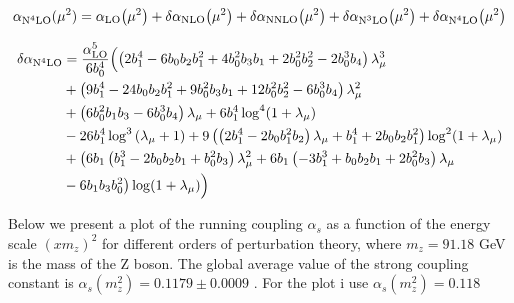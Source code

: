 \documentclass[../main.tex]{subfiles}
\begin{document}
\begin{equation}\label{eq:N4LO}
    \alpha_{\text{N}^4\text{LO}}(\mu^2) = \alpha_{\text{LO}}\qty(\mu^2) + \delta\alpha_{\text{NLO}}\qty(\mu^2)+\delta\alpha_{\text{NNLO}}\qty(\mu^2)+\delta\alpha_{\text{N}^3\text{LO}}\qty(\mu^2) + \delta\alpha_{\text{N}^4\text{LO}}\qty(\mu^2)
\end{equation}

\begin{equation}\label{eq:DN4LO}
    \begin{split}
        \delta\alpha_{\text{N}^4\text{LO}} &= \frac{\alpha_{\text{LO}}^5}{6 b_0^4} \Bigl( \left(2 b_1^4-6 b_0 b_2 b_1^2+4 b_0^2 b_3 b_1 + 2 b_0^2 b_2^2-2 b_0^3 b_4 \right) \lambda _{\mu}^3 \\
        &+ \left( 9 b_1^4-24 b_0 b_2 b_1^2+9 b_0^2 b_3 b_1+12 b_0^2 b_2^2-6 b_0^3 b_4\right) \lambda_{\mu}^2 \\
        &+ \left(6 b_0^2 b_1 b_3-6 b_0^3 b_4\right) \lambda_{\mu} + 6 b_1^4 \log ^4(1+ \lambda_{\mu})\\
        &- 26 b_1^4 \log ^3\left(\lambda _{\mu }+1\right)+9 \left(\left(2 b_1^4-2 b_0 b_1^2 b_2\right) \lambda _{\mu } + b_1^4+2 b_0 b_2 b_1^2\right) \log ^2(1+\lambda _{\mu})\\
        &+ \bigl(6 b_1 \left(b_1^3-2 b_0 b_2 b_1+b_0^2 b_3\right) \lambda _{\mu }^2
        + 6 b_1 \left(-3 b_1^3+b_0 b_2 b_1+2 b_0^2 b_3\right) \lambda_{\mu}\\
        &- 6 b_1 b_3 b_0^2 \bigr) \log(1+\lambda _{\mu }) \Bigr)
    \end{split}
\end{equation}


Below we present a plot of the running coupling $\alpha_s$ as a function of the energy scale $(x m_z)^2$ for different orders of perturbation theory,
where $m_z=91.18$ GeV is the mass of the Z boson. The global average value of the strong coupling constant is $\alpha_s(m_z^2) = 0.1179 \pm 0.0009$ \cite{PDG2022}.
For the plot i use $\alpha_s(m_z^2) = 0.118$  
\end{document}
